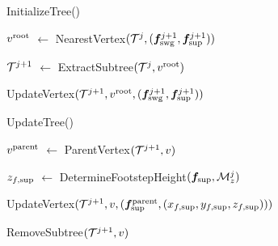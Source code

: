 \begin{procedure}%
	\small
	\removelatexerror
	\label{proc:InitializeTree}
	\caption{InitializeTree()}
	\vspace{2pt}
    \BlankLine
	
	$v^{\rm root}$ $\leftarrow$ NearestVertex$({\cal T}^j, ({\bm{f}}_{\rm swg}^{j+1}, {\bm{f}}_{\rm sup}^{j+1}))$\;
	
	${\cal T}^{j+1}$ $\leftarrow$ ExtractSubtree$({\cal T}^j, v^{\rm root})$\;
	
	UpdateVertex$({\cal T}^{j+1}, v^{\rm root}, ({\bm{f}}_{\rm swg}^{j+1}, {\bm{f}}_{\rm sup}^{j+1}))$\;
	
    \;
	
\end{procedure}

\begin{procedure}%
	\small
	\removelatexerror
	\label{proc:UpdateTree}
	
    \caption{UpdateTree()}
	\vspace{2pt}
    \BlankLine
	
	$v^{\rm parent}$ $\leftarrow$ ParentVertex$({\cal T}^{j+1}, v)$\;
    
    $z_{f, \rm sup}$ $\leftarrow$ DetermineFootstepHeight$({\bm{f}}_{\rm sup}, {\cal M}_z^j)$\;
    
    UpdateVertex$({\cal T}^{j+1}, v, ({\bm{f}}_{\rm sup}^{\rm parent}, (x_{f, \rm sup}, y_{f, \rm sup}, z_{f, \rm sup})))$\;
    
	{
 	    RemoveSubtree$({\cal T}^{j+1}, v)$\; 	
 	}
	 
    \Return\;   
	
\end{procedure}

